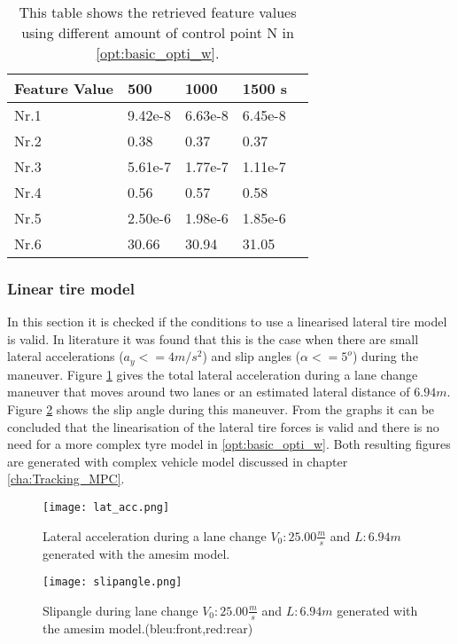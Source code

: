 \begin{table}[h!]
	\centering
	\begin{tabular}{@{}llllr@{}} \toprule
		Feature Value    & 500  & 1000      & 1500 s\\ \midrule
		Nr.1       & 9.42e-8     & 6.63e-8   & 6.45e-8\\
		Nr.2       & 0.38        & 0.37      & 0.37\\
		Nr.3       & 5.61e-7     & 1.77e-7   & 1.11e-7 \\
		Nr.4       & 0.56        & 0.57      & 0.58\\
		Nr.5       & 2.50e-6     & 1.98e-6   & 1.85e-6\\
		Nr.6       & 30.66       & 30.94     & 31.05\\ \bottomrule
	\end{tabular}
	\caption{This table shows the retrieved feature values using different amount of control point N in \ref{opt:basic_opti_w}.}
	\label{tab:GD_N}
\end{table}


\subsubsection{Linear tire model}
In this section it is checked if the conditions to use a linearised lateral tire model is valid. In literature \cite{TongDuySon2019} it was found that this is the case when there are small lateral accelerations ($a_y <= 4 m/s^2$) and slip angles ($\alpha <= 5^o$) during the maneuver. Figure \ref{fig:lat_acc_val} gives the total lateral acceleration during a lane change maneuver that moves around two lanes or an estimated lateral distance of $6.94 m$. Figure \ref{fig:slipangle_val} shows the slip angle during this maneuver. From the graphs it can be concluded that the linearisation of the lateral tire forces is valid and there is no need for a more complex tyre model in \ref{opt:basic_opti_w}.  Both resulting figures are generated with complex vehicle model discussed in chapter \ref{cha:Tracking_MPC}.

 \begin{figure}[h!]
	\centering
	\texttt{[image: lat\_acc.png]}
	\caption{Lateral acceleration during a lane change $V_0: 25.00 \frac{m}{s}$ and $L:6.94 m$ generated with the amesim model.}
	\label{fig:lat_acc_val}
\end{figure}

 \begin{figure}[h!]
	\centering
	\texttt{[image: slipangle.png]}
	\caption{Slipangle during lane change $V_0: 25.00 \frac{m}{s}$ and $L:6.94 m$ generated with the amesim model.(bleu:front,red:rear)}
	\label{fig:slipangle_val}
\end{figure}

